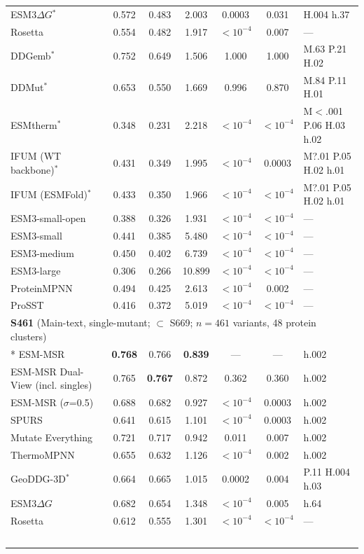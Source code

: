 {\begin{longtable}{lcccccl}
ESM3$\Delta G$$^*$ & 0.572 & 0.483 & 2.003 & 0.0003 & 0.031 & H.004 h.37 \\
Rosetta & 0.554 & 0.482 & 1.917 & $<10^{-4}$ & 0.007 & --- \\
DDGemb$^*$ & 0.752 & 0.649 & 1.506 & 1.000 & 1.000 & M.63 P.21 H.02 \\
DDMut$^*$ & 0.653 & 0.550 & 1.669 & 0.996 & 0.870 & M.84 P.11 H.01 \\
ESMtherm$^*$ & 0.348 & 0.231 & 2.218 & $<10^{-4}$ & $<10^{-4}$ & M$<$.001 P.06 H.03 h.02 \\
IFUM (WT backbone)$^*$ & 0.431 & 0.349 & 1.995 & $<10^{-4}$ & 0.0003 & M?.01 P.05 H.02 h.01 \\
IFUM (ESMFold)$^*$ & 0.433 & 0.350 & 1.966 & $<10^{-4}$ & $<10^{-4}$ & M?.01 P.05 H.02 h.01 \\
ESM3-small-open & 0.388 & 0.326 & 1.931 & $<10^{-4}$ & $<10^{-4}$ & --- \\
ESM3-small & 0.441 & 0.385 & 5.480 & $<10^{-4}$ & $<10^{-4}$ & --- \\
ESM3-medium & 0.450 & 0.402 & 6.739 & $<10^{-4}$ & $<10^{-4}$ & --- \\
ESM3-large & 0.306 & 0.266 & 10.899 & $<10^{-4}$ & $<10^{-4}$ & --- \\
ProteinMPNN & 0.494 & 0.425 & 2.613 & $<10^{-4}$ & 0.002 & --- \\
ProSST & 0.416 & 0.372 & 5.019 & $<10^{-4}$ & $<10^{-4}$ & --- \\
\midrule
\multicolumn{7}{l}{\textbf{S461} (Main-text, single-mutant; $\subset$ S669; $n=461$ variants, 48 protein clusters)} \\*
\midrule
ESM-MSR & \textbf{0.768} & 0.766 & \textbf{0.839} & --- & --- & h.002 \\
ESM-MSR Dual-View (incl. singles) & 0.765 & \textbf{0.767} & 0.872 & 0.362 & 0.360 & h.002 \\
ESM-MSR ($\sigma$=0.5) & 0.688 & 0.682 & 0.927 & $<10^{-4}$ & 0.0003 & h.002 \\
SPURS & 0.641 & 0.615 & 1.101 & $<10^{-4}$ & 0.0003 & h.002 \\
Mutate Everything & 0.721 & 0.717 & 0.942 & 0.011 & 0.007 & h.002 \\
ThermoMPNN & 0.655 & 0.632 & 1.126 & $<10^{-4}$ & 0.002 & h.002 \\
GeoDDG-3D$^*$ & 0.664 & 0.665 & 1.015 & 0.0002 & 0.004 & P.11 H.004 h.03 \\
ESM3$\Delta G$ & 0.682 & 0.654 & 1.348 & $<10^{-4}$ & 0.005 & h.64 \\
Rosetta & 0.612 & 0.555 & 1.301 & $<10^{-4}$ & $<10^{-4}$ & --- \\
$$
\end{longtable}}
